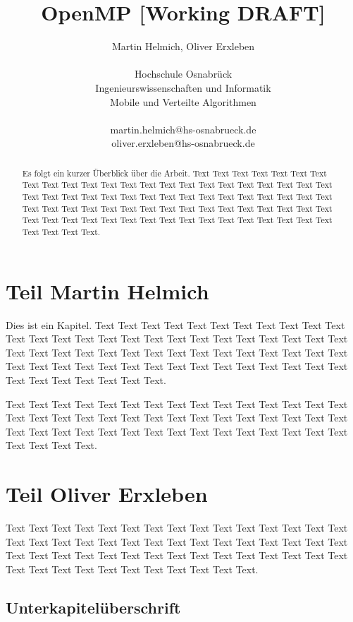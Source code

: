 \documentclass{lni}
\author{
	Martin Helmich, Oliver Erxleben \\ 
	\\ 
	Hochschule Osnabrück \\ 
	Ingenieurswissenschaften und Informatik \\ 
	Mobile und Verteilte Algorithmen \\ 
	\\ 
	martin.helmich@hs-osnabrueck.de \\
	oliver.erxleben@hs-osnabrueck.de
}
\title{OpenMP [Working DRAFT]}
\begin{document}
\maketitle

\tableofcontents


\pagebreak %


\begin{abstract}
Es folgt ein kurzer Überblick über die Arbeit. Text Text Text Text Text Text Text Text Text Text Text Text Text Text Text Text Text Text Text Text Text Text Text Text Text Text Text Text Text Text Text Text Text Text Text Text Text Text Text Text Text Text Text Text Text Text Text Text Text Text Text Text Text Text Text Text Text Text Text Text Text Text Text Text Text Text Text Text Text Text Text Text Text Text Text.
\end{abstract}

\section{Teil Martin Helmich}

Dies ist ein Kapitel. Text Text Text Text Text Text Text Text Text Text Text Text Text Text Text Text Text Text Text Text Text Text Text Text Text Text Text Text Text Text Text Text Text Text Text Text Text Text Text Text Text Text Text Text Text Text Text Text Text Text Text Text Text Text Text Text Text Text Text Text Text Text Text.

Text Text Text Text Text Text Text Text Text Text Text Text Text Text Text Text Text Text Text Text Text Text Text Text Text Text Text Text Text Text Text Text Text Text Text Text Text Text Text Text Text Text Text Text Text Text Text Text Text.

\pagebreak

\section{Teil Oliver Erxleben}

Text Text Text Text Text Text Text Text Text Text Text Text Text Text Text Text Text Text Text Text Text Text Text Text Text Text Text Text Text Text Text Text Text Text Text Text Text Text Text Text Text Text Text Text Text Text Text Text Text Text Text Text Text Text Text Text.

\subsection{Unterkapitelüberschrift}
\end{document}
